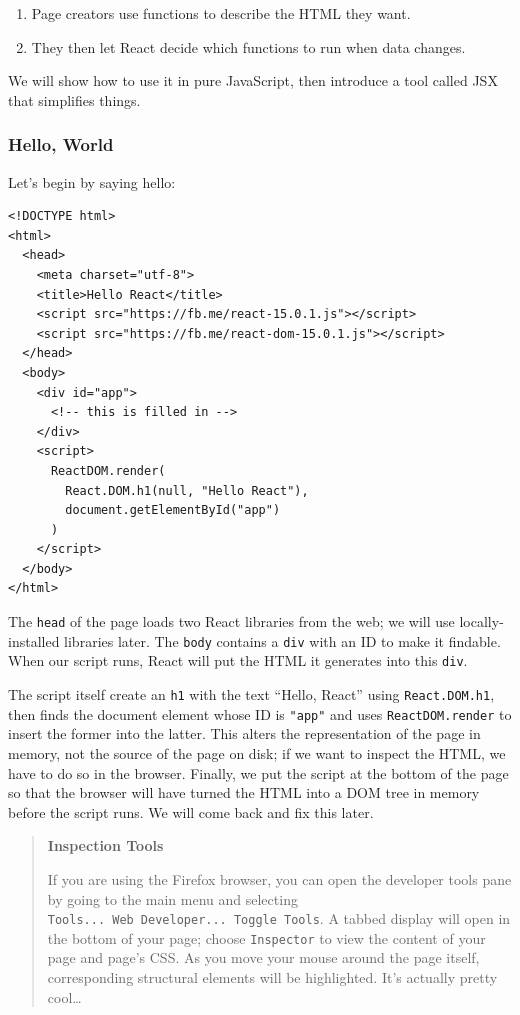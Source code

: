 \begin{enumerate}
\tightlist
\item
  Page creators use functions to describe the HTML they want.
\item
  They then let React decide which functions to run when data changes.
\end{enumerate}

We will show how to use it in pure JavaScript, then introduce a tool
called JSX that simplifies things.

\subsubsection{Hello, World}\label{s:dynamic-hello}

Let's begin by saying hello:

\begin{verbatim}
<!DOCTYPE html>
<html>
  <head>
    <meta charset="utf-8">
    <title>Hello React</title>
    <script src="https://fb.me/react-15.0.1.js"></script>
    <script src="https://fb.me/react-dom-15.0.1.js"></script>
  </head>
  <body>
    <div id="app">
      <!-- this is filled in -->
    </div>
    <script>
      ReactDOM.render(
        React.DOM.h1(null, "Hello React"),
        document.getElementById("app")
      )
    </script>
  </body>
</html>
\end{verbatim}

The \texttt{head} of the page loads two React libraries from the web; we
will use locally-installed libraries later. The \texttt{body} contains a
\texttt{div} with an ID to make it findable. When our script runs, React
will put the HTML it generates into this \texttt{div}.

The script itself create an \texttt{h1} with the text ``Hello, React''
using \texttt{React.DOM.h1}, then finds the document element whose ID is
\texttt{"app"} and uses \texttt{ReactDOM.render} to insert the former
into the latter. This alters the representation of the page in memory,
not the source of the page on disk; if we want to inspect the HTML, we
have to do so in the browser. Finally, we put the script at the bottom
of the page so that the browser will have turned the HTML into a DOM
tree in memory before the script runs. We will come back and fix this
later.

\begin{quote}
\textbf{Inspection Tools}

If you are using the Firefox browser, you can open the developer tools
pane by going to the main menu and selecting
\texttt{Tools...\ Web\ Developer...\ Toggle\ Tools}. A tabbed display
will open in the bottom of your page; choose \texttt{Inspector} to view
the content of your page and page's CSS. As you move your mouse around
the page itself, corresponding structural elements will be highlighted.
It's actually pretty cool\ldots{}
\end{quote}


